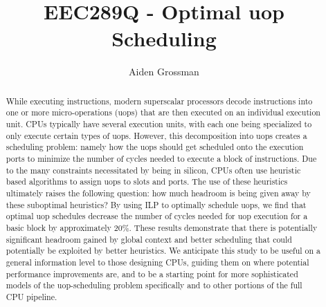 \documentclass[sigconf]{acmart}
\begin{document}
\title{EEC289Q - Optimal uop Scheduling}


\author{Aiden Grossman}

\renewcommand{\shortauthors}{Trovato and Tobin, et al.}

\begin{abstract}
While executing instructions, modern superscalar processors decode instructions into one or more
micro-operations (uops) that are then executed on an individual execution unit. CPUs typically have
several execution units, with each one being specialized to only execute certain types of uops. However,
this decomposition into uops creates a scheduling problem: namely how the uops should get scheduled onto
the execution ports to minimize the number of cycles needed to execute a block of instructions. Due to the
many constraints necessitated by being in silicon, CPUs often use heuristic based algorithms to assign uops
to slots and ports. The use of these heuristics ultimately raises the following question: how much headroom
is being given away by these suboptimal heuristics? By using ILP to optimally schedule uops, we find that
optimal uop schedules decrease the number of cycles needed for uop execution for a basic block by approximately
20\%. These results demonstrate that there is potentially significant headroom gained by global context and
better scheduling that could potentially be exploited by better heuristics. We anticipate this study to be
useful on a general information level to those designing CPUs, guiding them on where potential performance
improvements are, and to be a starting point for more sophisticated models of the uop-scheduling problem
specifically and to other portions of the full CPU pipeline.
\end{abstract}
\end{document}
